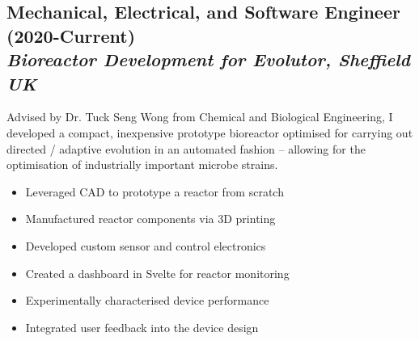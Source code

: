 \documentclass[twocolumn, a4paper, fontsize=9pt, headsepline, footsepline]{scrartcl}
\begin{document}
\subsection*{Mechanical, Electrical, and Software Engineer
  (2020-Current)\\\vspace{-3pt}\textmd{\emph{Bioreactor Development for Evolutor, Sheffield UK}}}
\noindent
Advised by Dr. Tuck Seng Wong from Chemical and Biological Engineering, I
developed a compact, inexpensive prototype bioreactor optimised for carrying out
directed / adaptive evolution in an automated fashion – allowing for the
optimisation of industrially important microbe strains.
\begin{itemize}
\item Leveraged CAD to prototype a reactor from scratch
\item Manufactured reactor components via 3D printing
\item Developed custom sensor and control electronics
\item Created a dashboard in Svelte for reactor monitoring
\item Experimentally characterised device performance
\item Integrated user feedback into the device design
\end{itemize}

\end{document}
